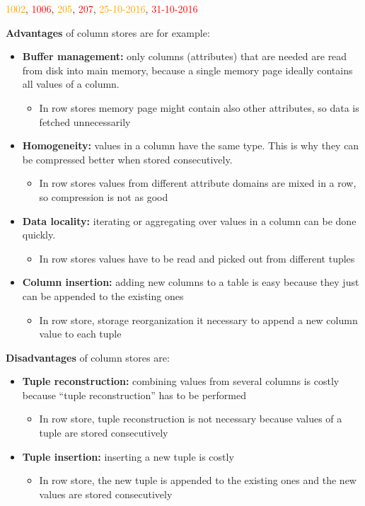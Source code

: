 \centerline{
\textcolor{orange}{1002}, \textcolor{red}{1006},
\textcolor{orange}{205}, \textcolor{red}{207},
\textcolor{orange}{25-10-2016}, \textcolor{red}{31-10-2016}
}
\textbf{Advantages} of column stores are for example:
\begin{itemize}
    \item \textbf{Buffer management:} only columns (attributes) that are needed are read from disk into main memory, because a single memory page ideally contains all values of a column.
    \begin{itemize}
        \item In row stores memory page might contain also other attributes, so data is fetched unnecessarily
    \end{itemize}
    \item \textbf{Homogeneity:} values in a column have the same type. This is why they can be compressed better when stored consecutively.
    \begin{itemize}
        \item In row stores values from different attribute domains are mixed in a row, so compression is not as good
    \end{itemize}
    \item \textbf{Data locality:} iterating or aggregating over values in a column can be done quickly.
    \begin{itemize}
        \item In row stores values have to be read and picked out from different tuples
    \end{itemize}
    \item \textbf{Column insertion:} adding new columns to a table is easy because they just can be appended to the existing ones
    \begin{itemize}
        \item  In row store, storage reorganization it necessary to append a new column value to each tuple
    \end{itemize}
\end{itemize}

\textbf{Disadvantages} of column stores are:
\begin{itemize}
    \item \textbf{Tuple reconstruction:} combining values from several columns is costly because “tuple reconstruction” has to be performed
    \begin{itemize}
        \item In row store, tuple reconstruction is not necessary because values of a tuple are stored consecutively
    \end{itemize}
    \item \textbf{Tuple insertion:} inserting a new tuple is costly
    \begin{itemize}
        \item In row store, the new tuple is appended to the existing ones and the new values are stored consecutively
    \end{itemize}
\end{itemize}

